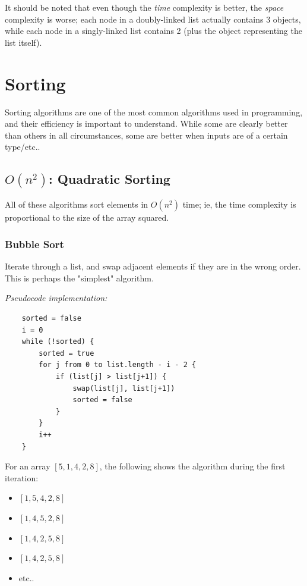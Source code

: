 \documentclass[12pt]{article}
\begin{document}
It should be noted that even though the \textit{time} complexity is better, the \textit{space} complexity is worse; each node in a doubly-linked list actually contains 3 objects, while each node in a singly-linked list contains 2 (plus the object representing the list itself).

\section{Sorting}
Sorting algorithms are one of the most common algorithms used in programming, and their efficiency is important to understand. While some are clearly better than others in all circumstances, some are better when inputs are of a certain type/etc..

\subsection{$O(n^2)$: Quadratic Sorting}
All of these algorithms sort elements in $O(n^2)$ time; ie, the time complexity is proportional to the size of the array squared.

\subsubsection{Bubble Sort}
Iterate through a list, and swap adjacent elements if they are in the wrong order. This is perhaps the "simplest" algorithm.

\textit{Pseudocode implementation:}

\begin{verbatim}
    sorted = false
    i = 0
    while (!sorted) {
        sorted = true
        for j from 0 to list.length - i - 2 {
            if (list[j] > list[j+1]) {
                swap(list[j], list[j+1])
                sorted = false
            }
        }
        i++
    }
\end{verbatim}

For an array $[5,1,4,2,8]$, the following shows the algorithm during the first iteration:

\begin{itemize}
    \item $[1,5,4,2,8]$
    \item $[1,4,5,2,8]$
    \item $[1,4,2,5,8]$
    \item $[1,4,2,5,8]$
    \item etc..
\end{itemize}
\end{document}
